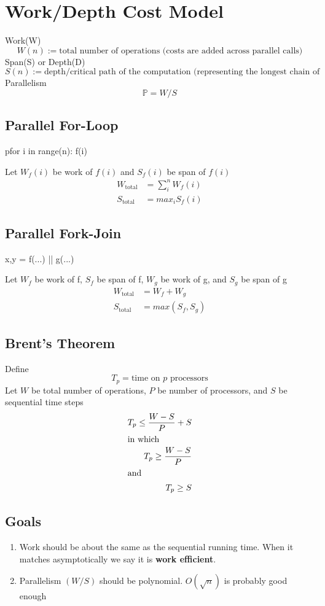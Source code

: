 \documentclass[12pt]{article}
\begin{document}
\section{Work/Depth Cost Model}
Work(W)
    $$W(n) := \text{total number of operations (costs are added across parallel calls)}$$
Span(S) or Depth(D)
$$S(n) := \text{depth/critical path of the computation (representing the longest chain of dependencies)}$$
Parallelism
$$\mathbb{P} = W/S$$

\subsection{Parallel For-Loop}
\begin{python}
pfor i in range(n):
    f(i)
\end{python}
Let $W_f(i)$ be work of $f(i)$ and $S_f(i)$ be span of $f(i)$
\begin{align*}
    W_{\text{total}} &= \sum_i^{n} W_f(i) \\
    S_{\text{total}} &= max_i S_f(i) 
\end{align*}

\subsection{Parallel Fork-Join}
\begin{python}
x,y = f(...) || g(...)
\end{python}
Let $W_f$ be work of f, $S_f$ be span of f, $W_g$ be work of g, and $S_g$ be span of g
\begin{align*}
    W_{\text{total}} &= W_f + W_g\\
    S_{\text{total}} &= max(S_f, S_g) 
\end{align*}

\subsection{Brent's Theorem}
Define
$$ T_p = \text{time on $p$ processors}$$
Let $W$ be total number of operations, $P$ be number of processors, and $S$ be sequential time steps
\begin{align*}
    T_p \leq \frac{W-S}{P} + S \\
    \intertext{in which}
    T_p \geq \frac{W-S}{P} \\
    \intertext{and}
    T_p \geq S
\end{align*}

\subsection{Goals}
\begin{enumerate}
    \item Work should be about the same as the sequential running time. When it matches asymptotically we say it is \textbf{work efficient}.
    \item Parallelism $(W/S)$ should be polynomial. $O(\sqrt{n})$ is probably good enough
\end{enumerate}
\end{document}
